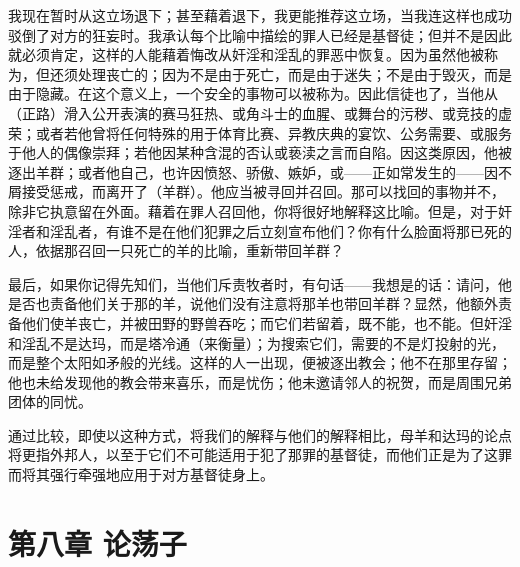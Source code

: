 我现在暂时从这立场退下；甚至藉着退下，我更能推荐这立场，当我连这样也成功驳倒了对方的狂妄时。我承认每个比喻中描绘的罪人已经是基督徒；但并不是因此就必须肯定，这样的人能藉着悔改从奸淫和淫乱的罪恶中恢复。因为虽然他被称为，但还须处理丧亡的；因为不是由于死亡，而是由于迷失；不是由于毁灭，而是由于隐藏。在这个意义上，一个安全的事物可以被称为。因此信徒也了，当他从（正路）滑入公开表演的赛马狂热、或角斗士的血腥、或舞台的污秽、或竞技的虚荣；或者若他曾将任何特殊的用于体育比赛、异教庆典的宴饮、公务需要、或服务于他人的偶像崇拜；若他因某种含混的否认或亵渎之言而自陷。因这类原因，他被逐出羊群；或者他自己，也许因愤怒、骄傲、嫉妒，或——正如常发生的——因不屑接受惩戒，而离开了（羊群）。他应当被寻回并召回。那可以找回的事物并不，除非它执意留在外面。藉着在罪人召回他，你将很好地解释这比喻。但是，对于奸淫者和淫乱者，有谁不是在他们犯罪之后立刻宣布他们？你有什么脸面将那已死的人，依据那召回一只死亡的羊的比喻，重新带回羊群？\par

最后，如果你记得先知们，当他们斥责牧者时，有句话——我想是的话：请问，他是否也责备他们关于那的羊，说他们没有注意将那羊也带回羊群？显然，他额外责备他们使羊丧亡，并被田野的野兽吞吃；而它们若留着，既不能，也不能。但奸淫和淫乱不是达玛，而是塔冷通（来衡量）；为搜索它们，需要的不是灯投射的光，而是整个太阳如矛般的光线。这样的人一出现，便被逐出教会；他不在那里存留；他也未给发现他的教会带来喜乐，而是忧伤；他未邀请邻人的祝贺，而是周围兄弟团体的同忧。\par

通过比较，即使以这种方式，将我们的解释与他们的解释相比，母羊和达玛的论点将更指外邦人，以至于它们不可能适用于犯了那罪的基督徒，而他们正是为了这罪而将其强行牵强地应用于对方基督徒身上。\par


\section{第八章 论荡子}


